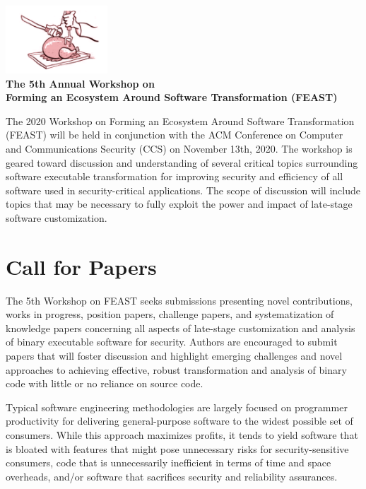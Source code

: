 \documentclass[10pt,letterpaper]{article}
\begin{document}
\begin{center}
\includegraphics[width=1.5in]{../../../images/logo.png} \\
{\large\bfseries The 5th Annual Workshop on} \\[5pt]
{\LARGE\bfseries Forming an Ecosystem Around Software Transformation (FEAST)}\par
\end{center}

The
2020
Workshop on Forming an Ecosystem Around Software Transformation (FEAST) will be held in conjunction with the ACM Conference on Computer and Communications Security (CCS) on
November 13th, 2020.
The workshop is geared toward discussion and understanding of several critical topics surrounding software executable transformation for improving security and efficiency of all software used in security-critical applications.
The scope of discussion will include topics that may be necessary to fully exploit the power and impact of late-stage software customization.

\section*{Call for Papers}

The 5th Workshop on FEAST
seeks submissions presenting novel contributions, works in progress, position papers, challenge papers, and systematization of knowledge papers
concerning all aspects of late-stage customization and analysis of binary executable software for security.
Authors are encouraged to submit papers that will foster discussion and highlight emerging challenges and novel approaches to achieving effective, robust transformation and analysis of binary code with little or no reliance on source code.

Typical software engineering methodologies are largely focused on programmer productivity for delivering general-purpose software to the widest possible set of consumers.
While this approach maximizes profits, it tends to yield
software that is bloated with features that might pose unnecessary risks for security-sensitive consumers,
code that is unnecessarily inefficient in terms of time and space overheads,
and/or software that sacrifices security and reliability assurances.
\end{document}

